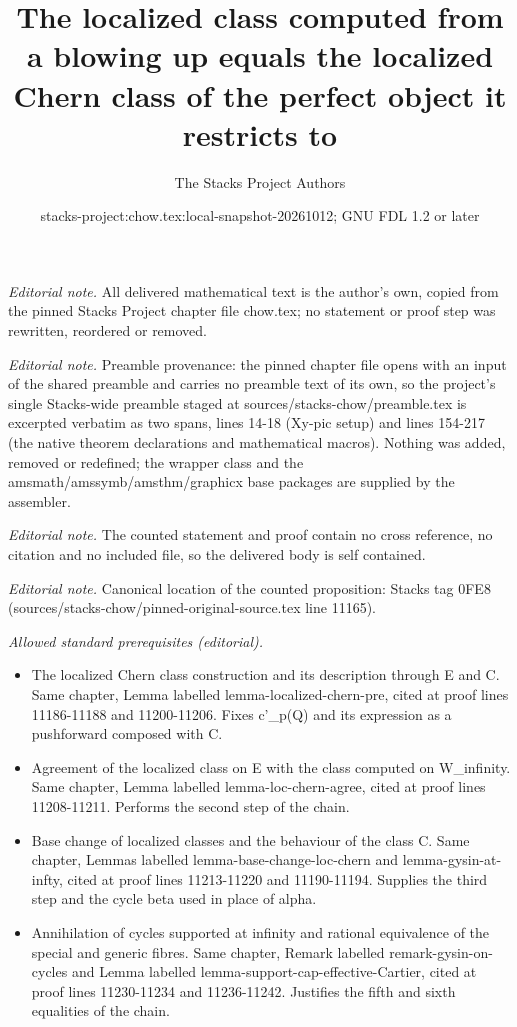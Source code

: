 \documentclass[10pt,a4paper]{amsart}
\title{The localized class computed from a blowing up equals the localized Chern class of the perfect object it restricts to}
\author{The Stacks Project Authors}
\date{stacks-project:chow.tex:local-snapshot-20261012; GNU FDL 1.2 or later}
\theoremstyle{plain}
\theoremstyle{definition}
\theoremstyle{remark}
\numberwithin{equation}{subsection}
\begin{document}
\maketitle
\noindent\textit{Editorial note.} All delivered mathematical text is the author's own, copied from the pinned Stacks Project chapter file chow.tex; no statement or proof step was rewritten, reordered or removed.\par\medskip
\noindent\textit{Editorial note.} Preamble provenance: the pinned chapter file opens with an input of the shared preamble and carries no preamble text of its own, so the project's single Stacks-wide preamble staged at sources/stacks-chow/preamble.tex is excerpted verbatim as two spans, lines 14-18 (Xy-pic setup) and lines 154-217 (the native theorem declarations and mathematical macros). Nothing was added, removed or redefined; the wrapper class and the amsmath/amssymb/amsthm/graphicx base packages are supplied by the assembler.\par\medskip
\noindent\textit{Editorial note.} The counted statement and proof contain no cross reference, no citation and no included file, so the delivered body is self contained.\par\medskip
\noindent\textit{Editorial note.} Canonical location of the counted proposition: Stacks tag 0FE8 (sources/stacks-chow/pinned-original-source.tex line 11165).\par\medskip
\noindent\textit{Allowed standard prerequisites (editorial).}\begin{itemize}
\item The localized Chern class construction and its description through E and C. Same chapter, Lemma labelled lemma-localized-chern-pre, cited at proof lines 11186-11188 and 11200-11206. Fixes c'\_p(Q) and its expression as a pushforward composed with C.
\item Agreement of the localized class on E with the class computed on W\_infinity. Same chapter, Lemma labelled lemma-loc-chern-agree, cited at proof lines 11208-11211. Performs the second step of the chain.
\item Base change of localized classes and the behaviour of the class C. Same chapter, Lemmas labelled lemma-base-change-loc-chern and lemma-gysin-at-infty, cited at proof lines 11213-11220 and 11190-11194. Supplies the third step and the cycle beta used in place of alpha.
\item Annihilation of cycles supported at infinity and rational equivalence of the special and generic fibres. Same chapter, Remark labelled remark-gysin-on-cycles and Lemma labelled lemma-support-cap-effective-Cartier, cited at proof lines 11230-11234 and 11236-11242. Justifies the fifth and sixth equalities of the chain.
\end{itemize}\medskip
\end{document}
